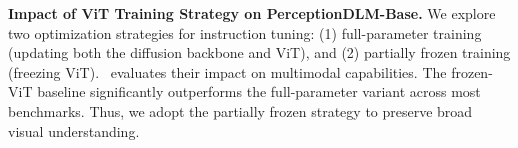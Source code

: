 \documentclass{llmxive}
\providecommand{\arraystretch}{1.3}
\begin{document}

\begin{table}[htbp]
\centering
\setlength{\tabcolsep}{3pt}
\renewcommand{\arraystretch}{1.15}
\caption{Multimodal benchmark comparison between PerceptionDLM-Base with trainable ViT variant and the frozen-ViT baseline. The compared benchmarks follow the same protocol as in~.}
\label{tab:multimodal_vit_train_vs_freeze}
\end{table}


\noindent
\textbf{Impact of ViT Training Strategy on PerceptionDLM-Base.}
We explore two optimization strategies for instruction tuning: (1) full-parameter training (updating both the diffusion backbone and ViT), and (2) partially frozen training (freezing ViT).~ evaluates their impact on multimodal capabilities. The frozen-ViT baseline significantly outperforms the full-parameter variant across most benchmarks. Thus, we adopt the partially frozen strategy to preserve broad visual understanding.


\end{document}
